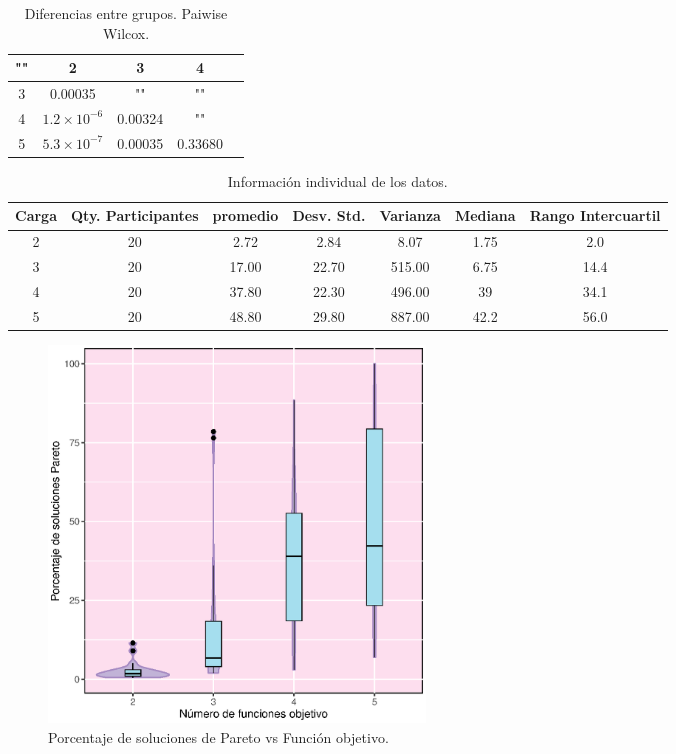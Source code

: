 \documentclass{article}
\begin{document}
\begin{table}[htb]
    \centering
    \caption{Diferencias entre grupos. Paiwise Wilcox.} 
    \begin{tabular}{|c|c|c|c|c|}
    \hline
    "" & 2 & 3 & 4 \\
    \hline
    3 & 0.00035 & "" & "" \\
    \hline
    4 & $1.2\times 10^{-6}$ & 0.00324  & "" \\
    \hline
    5 & $5.3\times 10^{-7}$ & 0.00035 & 0.33680 \\
    \hline
    \end{tabular}
    \label{cuadro 3}
\end{table}

\begin{table}[htb]
    \centering
    \caption{Informaci\'on individual de los datos.} 
    \begin{tabular}{|c|c|c|c|c|c|c|}
    \hline
    Carga & Qty. Participantes & promedio & Desv. Std. & Varianza & Mediana & Rango Intercuartil  \\
    \hline
    2 & 20 & 2.72 & 2.84 & 8.07 & 1.75 & 2.0 \\
    \hline
    3 & 20 & 17.00 & 22.70 & 515.00 & 6.75 & 14.4 \\
    \hline
    4 & 20 & 37.80 & 22.30 & 496.00 & 39 & 34.1 \\
    \hline
    5 & 20 & 48.80 & 29.80 & 887.00 & 42.2 & 56.0 \\
    \hline
\end{tabular}
    \label{cuadro 4}
\end{table}

\begin{figure}[htb!] %
    \centering
    \includegraphics[width=100mm]{HW11.eps} %
    \caption{Porcentaje de soluciones de Pareto vs Funci\'on objetivo.}
    \label{Figura 1}
\end{figure}
\newpage
\end{document}
